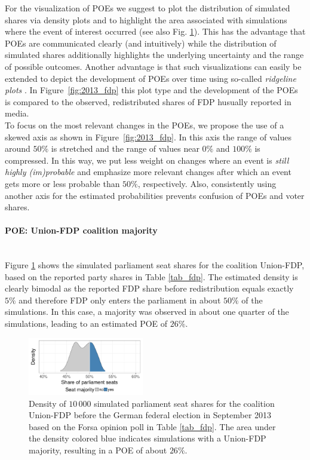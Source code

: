 \documentclass[smallcondensed]{svjour3}     %
\begin{document}
For the visualization of POEs we suggest to plot the distribution of
simulated shares via density plots and to highlight the area associated
with simulations where the event of interest occurred
(see also Fig. \ref{fig:seatDist}). This has the advantage that POEs are
communicated clearly (and intuitively) while the distribution of simulated
shares additionally highlights the underlying uncertainty and the range
of possible outcomes. Another advantage is that such visualizations can easily
be extended to depict the development of POEs over time using so-called
\emph{ridgeline plots} \citep{wilke_2017}. In Figure~\ref{fig:2013_fdp} this
plot type and the development of the POEs is compared to the observed,
redistributed shares of FDP husually reported in media. \\

To focus on the most relevant changes in the POEs, we propose
the use of a skewed axis as shown in Figure~\ref{fig:2013_fdp}. In this axis
the range of values around $50\%$ is stretched and the range of values near
$0\%$ and $100\%$ is compressed. In this way, we put less weight on changes
where an event is {\it still highly (im)probable} and emphasize more relevant
changes after which an event gets more or less probable than $50\%$, respectively. Also,
consistently using another axis for the estimated probabilities prevents
confusion of POEs and voter shares.


\paragraph{POE: Union-FDP coalition majority} \ \\

Figure \ref{fig:seatDist} shows the simulated parliament seat shares for the
coalition Union-FDP, based on the reported party shares in Table \ref{tab_fdp}.
The estimated density is clearly bimodal as the reported FDP share before
redistribution equals exactly $5\%$ and therefore FDP only enters the parliament
in about $50\%$ of the simulations. In this case, a majority was observed in about
one quarter of the simulations, leading to an estimated POE of $26\%$.

\begin{figure}[H]\centering
\includegraphics[width=0.45\textwidth]{figures/2013_forsa_cdufdp_lastPreelectionPoll.pdf}
\caption{Density of $10\,000$ simulated parliament seat shares for the coalition
Union-FDP before the German federal election in September 2013 based on the Forsa
opinion poll in Table \ref{tab_fdp}. The area under the density colored blue
indicates simulations with a Union-FDP majority, resulting in a
POE of about $26\%$.
\label{fig:seatDist}
}
\end{figure}
\end{document}
